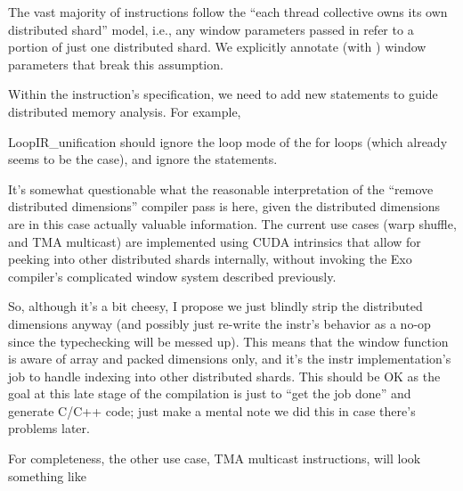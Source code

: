 \filbreak
{}

The vast majority of instructions follow the ``each thread collective owns its own distributed shard'' model, i.e., any window parameters passed in refer to a portion of just one distributed shard.
We explicitly annotate (with ) window parameters that break this assumption.

\filbreak
Within the instruction's  specification, we need to add new  statements to guide distributed memory analysis.
For example,



\filbreak
LoopIR\_unification should ignore the loop mode of the for loops (which already seems to be the case), and ignore the  statements.

\filbreak
It's somewhat questionable what the reasonable interpretation of the ``remove distributed dimensions'' compiler pass is here, given the distributed dimensions are in this case actually valuable information.
The current use cases (warp shuffle, and TMA multicast) are implemented using CUDA intrinsics that allow for peeking into other distributed shards internally, without invoking the Exo compiler's complicated window system described previously.

\filbreak
So, although it's a bit cheesy, I propose we just blindly strip the distributed dimensions anyway (and possibly just re-write the instr's behavior as a no-op since the typechecking will be messed up).
This means that the window  function is aware of array and packed dimensions only, and it's the instr implementation's job to handle indexing into other distributed shards.
This should be OK as the goal at this late stage of the compilation is just to ``get the job done'' and generate C/C++ code;
just make a mental note we did this in case there's problems later.

\filbreak
For completeness, the other use case, TMA multicast instructions, will look something like




